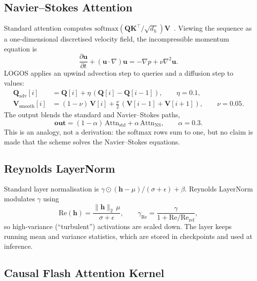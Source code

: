 \documentclass[11pt,a4paper]{article}
\newcommand{\LOGOS}{\textsc{LOGOS}}
\newcommand{\softmax}{\mathrm{softmax}}
\begin{document}
\subsection{Navier--Stokes Attention}
\label{sec:ns_attn}

Standard attention computes
$\softmax(\mathbf{Q}\mathbf{K}^\top/\sqrt{d_h})\mathbf{V}$~\citep{vaswani2017attention}.
Viewing the sequence as a one-dimensional discretised velocity field,
the incompressible momentum equation is
\begin{equation}
  \frac{\partial\mathbf{u}}{\partial t}
  + (\mathbf{u}\cdot\nabla)\mathbf{u}
  = -\nabla p + \nu\nabla^2\mathbf{u}.
\end{equation}
\LOGOS{} applies an upwind advection step to queries and a
diffusion step to values:
\begin{align}
  \mathbf{Q}_{\text{adv}}[i] &= \mathbf{Q}[i] + \eta\,(\mathbf{Q}[i] - \mathbf{Q}[i-1]),
  \qquad \eta=0.1,\\
  \mathbf{V}_{\text{smooth}}[i] &= (1-\nu)\,\mathbf{V}[i]
    + \tfrac{\nu}{2}\,(\mathbf{V}[i-1]+\mathbf{V}[i+1]),
  \qquad \nu=0.05.
\end{align}
The output blends the standard and Navier--Stokes paths,
\begin{equation}
  \mathbf{out} = (1-\alpha)\,\mathrm{Attn}_{\text{std}} + \alpha\,\mathrm{Attn}_{\text{NS}},
  \qquad \alpha=0.3.
\end{equation}
This is an analogy, not a derivation: the softmax rows sum to one, but
no claim is made that the scheme solves the Navier--Stokes equations.

\subsection{Reynolds LayerNorm}
\label{sec:reynolds}

Standard layer normalisation is
$\gamma\odot(\mathbf{h}-\mu)/(\sigma+\epsilon)+\beta$.
Reynolds LayerNorm modulates $\gamma$ using
\begin{equation}
  \mathrm{Re}(\mathbf{h}) = \frac{\|\mathbf{h}\|_2\,\mu}{\sigma + \epsilon},
  \qquad
  \gamma_{\mathrm{Re}} = \frac{\gamma}{1 + \mathrm{Re}/\mathrm{Re}_{\text{ref}}},
\end{equation}
so high-variance (``turbulent'') activations are scaled down. The layer
keeps running mean and variance statistics, which are stored in
checkpoints and used at inference.

\subsection{Causal Flash Attention Kernel}
\label{sec:flash}
\end{document}
